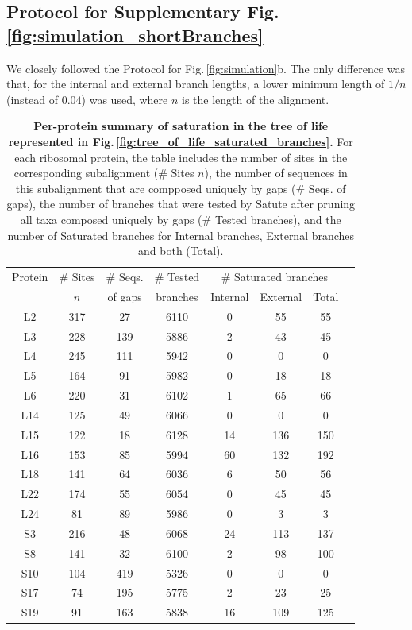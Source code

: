 \color{black}


\subsection*{Protocol for Supplementary Fig.\,\ref{fig:simulation_shortBranches}}We closely followed the Protocol for Fig.\,\ref{fig:simulation}b. The only difference was that, for the internal and external branch lengths, a lower minimum length of $1/n$ (instead of $0.04$) was used, where $n$ is the length of the alignment.

\newpage

\begin{table}[h!]
     \centering 
    \begin{tabular}{|c|c|c|c|c|c|c|c|}
      \hline
       Protein & \# Sites & \# Seqs. & \# Tested  &\multicolumn{3}{c|}{\# Saturated branches}\\
& $n$ & of gaps &branches& Internal & External & Total\\
\hline
L2  & 317 &  27 & 6110 &  0 &  55 &  55\\
L3  & 228 & 139 & 5886 &  2 &  43 &  45\\
L4  & 245 & 111 & 5942 &  0 &   0 &   0\\
L5  & 164 &  91 & 5982 &  0 &  18 &  18\\
L6  & 220 &  31 & 6102 &  1 &  65 &  66\\
L14 & 125 &  49 & 6066 &  0 &   0 &   0\\
L15 & 122 &  18 & 6128 & 14 & 136 & 150\\
L16 & 153 &  85 & 5994 & 60 & 132 & 192\\
L18 & 141 &  64 & 6036 &  6 &  50 &  56\\
L22 & 174 &  55 & 6054 &  0 &  45 &  45\\
L24 &  81 &  89 & 5986 &  0 &   3 &   3\\
S3  & 216 &  48 & 6068 & 24 & 113 & 137\\
S8  & 141 &  32 & 6100 &  2 &  98 & 100\\
S10 & 104 & 419 & 5326 &  0 &   0 &   0\\
S17 &  74 & 195 & 5775 &  2 &  23 &  25\\
S19 &  91 & 163 & 5838 & 16 & 109 & 125\\
\hline
     \end{tabular}
     \vspace{0.25cm}
     \caption{ \textbf{Per-protein summary of saturation in the tree of life represented in Fig.\,\ref{fig:tree_of_life_saturated_branches}.} For each ribosomal protein, the table includes the number of sites in the corresponding subalignment (\# Sites $n$), the number of sequences in this subalignment that are compposed uniquely by gaps (\# Seqs. of gaps), the number of branches that were tested by Satute after pruning all taxa composed uniquely by gaps (\# Tested branches),  and the number of Saturated branches for Internal branches, External branches and both (Total).}
	\label{table:per_protein_summary}
    \end{table}

